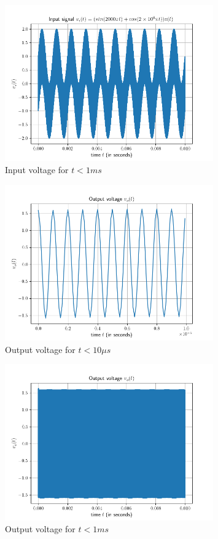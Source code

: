 \documentclass[12pt, a4paper]{article}
\begin{document}
\begin{figure}[H]
\centering
\includegraphics[width=0.8\textwidth]{q2Input2.png}
\caption{Input voltage for $t < 1ms$}
\end{figure}

\begin{figure}[H]
\centering
\includegraphics[width=0.8\textwidth]{q2Output1.png}
\caption{Output voltage for $t < 10\mu s$}
\end{figure}

\begin{figure}[H]
\centering
\includegraphics[width=0.8\textwidth]{q2Output2.png}
\caption{Output voltage for $t < 1ms$}
\end{figure}
\end{document}
